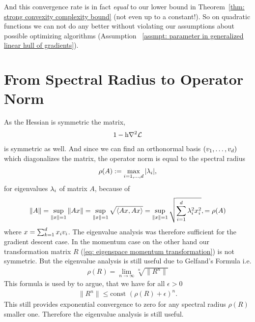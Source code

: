 And this convergence rate is in fact \emph{equal} to our lower bound  in
Theorem~\ref{thm: strong convexity complexity bound} (not even up to a
constant!). So on quadratic functions we can not do any better without violating
our assumptions about possible optimizing algorithms (Assumption~ \ref{assmpt:
parameter in generalized linear hull of gradients}).

\section{From Spectral Radius to Operator Norm}

As the Hessian is symmetric the matrix,
\begin{align*}
	1-\text{h} \nabla^2\mathcal{L}
\end{align*}
is symmetric as well. And since we can find an orthonormal basis \((v_1,\dots,
v_d)\) which diagonalizes the matrix, the operator norm is equal
to the spectral radius
\begin{align*}
	\rho(A)
	:= \max_{i=1,\dots,d} |\lambda_i|,
\end{align*}
for eigenvalues \(\lambda_i\) of matrix \(A\), because of
\begin{align*}
	\|A\| = \sup_{\|x\| =1} \|Ax\|
	= \sup_{\|x\| =1} \sqrt{\langle Ax, Ax\rangle}
	= \sup_{\|x\| =1} \sqrt{\sum_{i=1}^d \lambda_i^2 x_i^2},
	= \rho(A)
\end{align*}
where \(x=\sum_{k=1}^d x_i v_i\). The eigenvalue analysis was therefore
sufficient for the gradient descent case. In the momentum case on the other
hand our transformation matrix \(R\) (\ref{eq: eigenspace momentum transformation})
is not symmetric. But the eigenvalue analysis is still useful due to Gelfand's Formula
\parencite{gelfandNormierteRinge1941} i.e.
\begin{align*}
	\rho(R) = \lim_{n\to\infty}\sqrt[n]{\|R^n\|}
\end{align*}
This formula is used by \textcite[p. 38, Lemma 1]{polyakIntroductionOptimization1987}
to argue, that we have for all \(\epsilon>0\)
\begin{align*}
	\|R^n\|\le \text{const } (\rho(R) + \epsilon)^n.
\end{align*}
This still provides exponential convergence to zero for any spectral radius
\(\rho(R)\) smaller one. Therefore the eigenvalue analysis is still useful.

